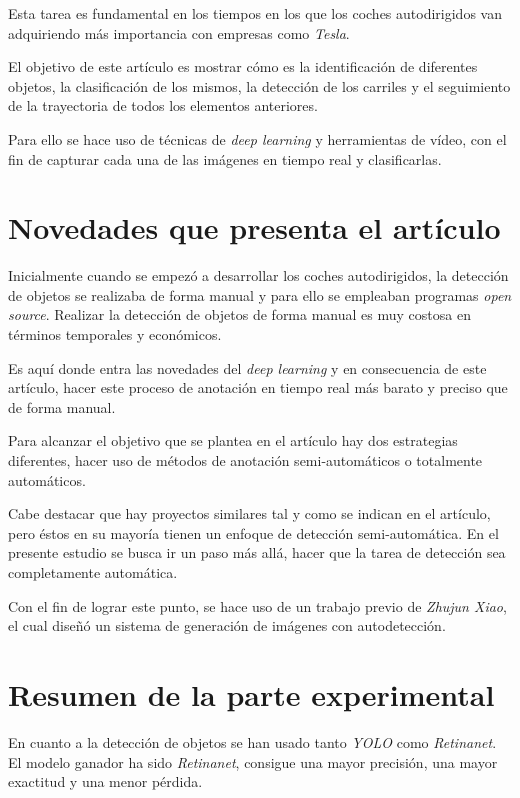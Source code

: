 \documentclass[a4paper, 11pt]{memoir}
\begin{document}
	Esta tarea es fundamental en los tiempos en los que los coches autodirigidos van adquiriendo
	más importancia con empresas como \emph{Tesla}.

	El objetivo de este artículo es mostrar cómo es la identificación de diferentes objetos, 
	la clasificación de los mismos, la detección de los carriles y el seguimiento de la 
	trayectoria de todos los elementos anteriores. 
	
	Para ello se hace uso de técnicas de \emph{deep learning} y herramientas de vídeo, 
	con el fin de capturar cada una de las imágenes en tiempo real y clasificarlas.

	\section{Novedades que presenta el artículo}
	Inicialmente cuando se empezó a desarrollar los coches autodirigidos, la detección de objetos
	se realizaba de forma manual y para ello se empleaban programas \emph{open source}. Realizar
	la detección de objetos de forma manual es muy costosa en términos temporales y económicos.

	Es aquí donde entra las novedades del \emph{deep learning} y en consecuencia de este
	artículo, hacer este proceso de anotación en tiempo real más barato y preciso que de forma
	manual.
	
	Para alcanzar el objetivo que se plantea en el artículo hay dos estrategias diferentes,
	hacer uso de métodos de anotación semi-automáticos o totalmente automáticos.

	Cabe destacar que hay proyectos similares tal y como se indican en el artículo, pero éstos
	en su mayoría tienen un enfoque de detección semi-automática. En el presente estudio se 
	busca ir un paso más allá, hacer que la tarea de detección sea completamente automática.

	Con el fin de lograr este punto, se hace uso de un trabajo previo de \emph{Zhujun Xiao}, el
	cual diseñó un sistema de generación de imágenes con autodetección.
	
	\section{Resumen de la parte experimental}
	En cuanto a la detección de objetos se han usado tanto \emph{YOLO} como \emph{Retinanet}.
	El modelo ganador ha sido \emph{Retinanet}, consigue una mayor precisión, una mayor exactitud y
	una menor pérdida.
\end{document}
